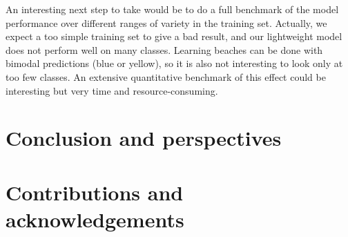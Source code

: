 \documentclass[10pt,twocolumn,letterpaper]{article}
\begin{document}
An interesting next step to take would be to do a full benchmark of the model performance over different ranges of variety in the training set. Actually, we expect a too simple training set to give a bad result, and our lightweight model does not perform well on many classes. Learning beaches can be done with bimodal predictions (blue or yellow), so it is also not interesting to look only at too few classes. An extensive quantitative benchmark of this effect could be interesting but very time and resource-consuming. 
\section{Conclusion and perspectives}
\section*{Contributions and acknowledgements}


{\small


}
\end{document}
